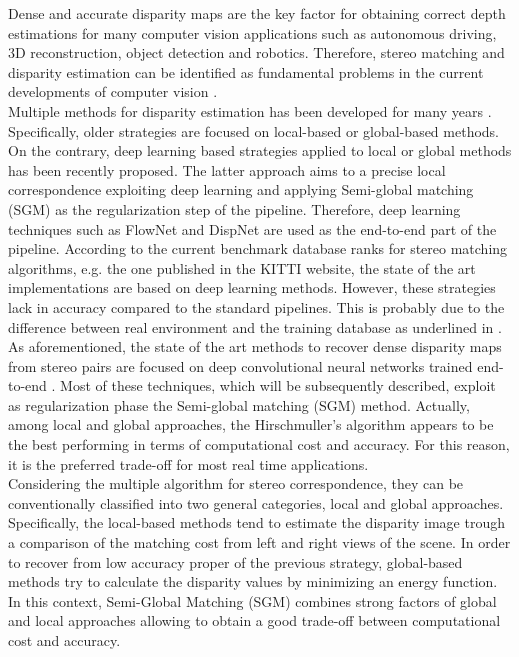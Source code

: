 Dense and accurate disparity maps are the key factor for obtaining correct depth estimations for many computer vision applications such as autonomous driving, 3D reconstruction, object detection and robotics.  
Therefore, stereo matching and disparity estimation can be identified as fundamental problems in the current developments of computer vision \citep{Seki2017}.\\
Multiple methods for disparity estimation has been developed for many years \citep{Seki2017}. 
Specifically, older strategies are focused on local-based or global-based methods. On the contrary, deep learning based strategies applied to local or global methods has been recently proposed. 
The latter approach aims to a precise local correspondence exploiting deep learning and applying Semi-global matching (SGM) as the regularization step of the pipeline. 
Therefore, deep learning techniques such as FlowNet and DispNet \citep{Seki2017} are used as the end-to-end part of the pipeline.
According to the current benchmark database ranks for stereo matching algorithms, e.g. the one published in the KITTI website, the state of the art implementations are based on deep learning methods. 
However, these strategies lack in accuracy compared to the standard pipelines. 
This is probably due to the difference between real environment and the training database as underlined in \citep{Seki2017} \citep{Poggi2019}.\\
As aforementioned, the state of the art methods to recover dense disparity maps from stereo pairs are focused on deep convolutional neural networks trained end-to-end \citep{Tonioni2020}. 
Most of these techniques, which will be subsequently described, exploit as regularization phase the Semi-global matching (SGM) method.
Actually, among local and global approaches, the Hirschmuller's algorithm \citep{Hirschmuller2008} appears to be the best performing in terms of computational cost and accuracy. 
For this reason, it is the preferred trade-off for most real time applications.\\
Considering the multiple algorithm for stereo correspondence, they can be conventionally classified \citep{Scharstein2001} into two general categories, local and global approaches.
Specifically, the local-based methods tend to estimate the disparity image trough a comparison of the matching cost from left and right views of the scene. 
In order to recover from low accuracy proper of the previous strategy, global-based methods try to calculate the disparity values by minimizing an energy function.
In this context, Semi-Global Matching (SGM) combines strong factors of global and local approaches allowing to obtain a good trade-off between computational cost and accuracy. \\
